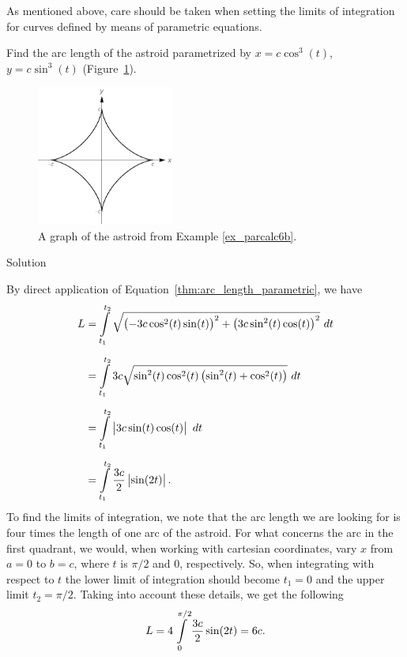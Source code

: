 As mentioned above, care should be taken when setting the limits of integration for curves defined by means of parametric equations.

\begin{example}\label{ex_parcalc6b}
Find the arc length of the astroid parametrized by $x=c\cos^3(t)$, $y=c\sin^3(t)$ (Figure~\ref{fig_int_app_24}). 


	\begin{figure}[H]
	\begin{center}
			\includegraphics[width=0.4\textwidth]{fig_int_app_24}
	\caption{A graph of the astroid from Example \ref{ex_parcalc6b}.}
	\label{fig_int_app_24}
	\end{center}
\end{figure}

\pagebreak
{}Solution 

By direct application of Equation~\eqref{thm:arc_length_parametric}, we have
\begin{align*}
L &= \ds\int\limits_{t_1}^{t_2} \sqrt{\left(-3c\cos^2(t)\sin(t)\right)^2 +\left(3c\sin^2(t)\cos(t)\right)^2} \ dt\\[0.2cm]
&=\ds\int\limits_{t_1}^{t_2} 3c\sqrt{\sin^2(t)\cos^2(t)\left(\sin^2(t)+\cos^2(t)\right)}\ dt\\[0.2cm]
&=\ds\int\limits_{t_1}^{t_2} \left|3c\sin(t)\cos(t)\right|\ dt\\[0.2cm]
&=\ds\int\limits_{t_1}^{t_2}  \dfrac{3c}{2}\left|\sin(2t)\right|.
	\end{align*}
To find the limits of integration, we note that the arc length we are looking for is four times the length of one arc of the astroid. For what concerns the arc in the first quadrant, we would, when working with cartesian coordinates, vary $x$ from $a=0$ to $b=c$,  where $t$ is $\pi/2$ and $0$, respectively. So, when integrating with respect to $t$ the lower limit of integration should become $t_1=0$ and the upper limit $t_2=\pi/2$. Taking into account these details, we get the following
$$
L =\displaystyle4\int\limits_{0}^{\pi/2}  \dfrac{3c}{2}\sin(2t)=6c.
$$
	
\end{example}


